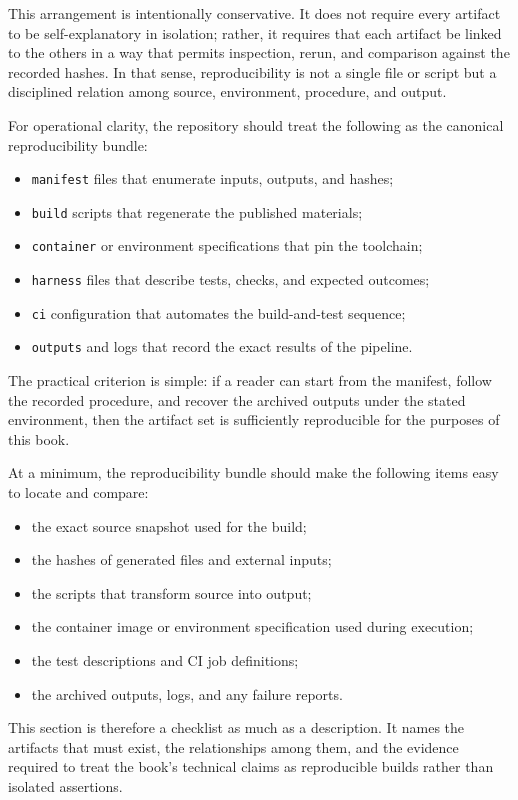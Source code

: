 This arrangement is intentionally conservative. It does not require every artifact to be self-explanatory in isolation; rather, it requires that each artifact be linked to the others in a way that permits inspection, rerun, and comparison against the recorded hashes. In that sense, reproducibility is not a single file or script but a disciplined relation among source, environment, procedure, and output.

For operational clarity, the repository should treat the following as the canonical reproducibility bundle:
\begin{itemize}
  \item \texttt{manifest} files that enumerate inputs, outputs, and hashes;
  \item \texttt{build} scripts that regenerate the published materials;
  \item \texttt{container} or environment specifications that pin the toolchain;
  \item \texttt{harness} files that describe tests, checks, and expected outcomes;
  \item \texttt{ci} configuration that automates the build-and-test sequence;
  \item \texttt{outputs} and logs that record the exact results of the pipeline.
\end{itemize}

The practical criterion is simple: if a reader can start from the manifest, follow the recorded procedure, and recover the archived outputs under the stated environment, then the artifact set is sufficiently reproducible for the purposes of this book.

At a minimum, the reproducibility bundle should make the following items easy to locate and compare:
\begin{itemize}
  \item the exact source snapshot used for the build;
  \item the hashes of generated files and external inputs;
  \item the scripts that transform source into output;
  \item the container image or environment specification used during execution;
  \item the test descriptions and CI job definitions;
  \item the archived outputs, logs, and any failure reports.
\end{itemize}

This section is therefore a checklist as much as a description. It names the artifacts that must exist, the relationships among them, and the evidence required to treat the book's technical claims as reproducible builds rather than isolated assertions.
